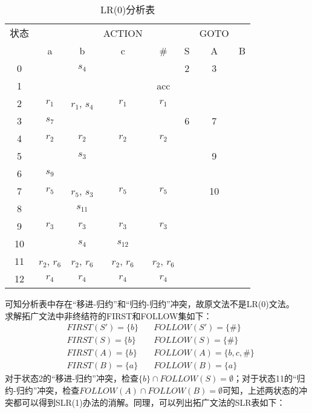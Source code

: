 \begin{table}[H]
	\caption{LR(0)分析表}
	\centering
	\begin{tabular}{|c|cccc|ccc|}
		\hline
		状态 & & & ACTION & & & GOTO & \\
		& a & b & c & \# & S & A & B \\\hline
		0 &  & $s_{4}$ &  &  & 2 & 3 & \\
		1 &  &  &  & acc &  &  & \\
		2 & $r_{1}$ & $r_{1}$, $s_{4}$ & $r_{1}$ & $r_{1}$ &  &  & \\
		3 & $s_{7}$ &  &  &  & 6 & 7 & \\
		4 & $r_{2}$ & $r_{2}$ & $r_{2}$ & $r_{2}$ &  &  & \\
		5 &  & $s_{3}$ &  &  &  & 9 & \\
		6 & $s_{9}$ &  &  &  &  &  & \\
		7 & $r_{5}$ & $r_{5}$, $s_{3}$ & $r_{5}$ & $r_{5}$ &  & 10 & \\
		8 &  & $s_{11}$ &  &  &  &  & \\
		9 & $r_{3}$ & $r_{3}$ & $r_{3}$ & $r_{3}$ &  &  & \\
		10 &  & $s_{4}$ & $s_{12}$ &  &  &  & \\
		11 & $r_{2}$, $r_{6}$ & $r_{2}$, $r_{6}$ & $r_{2}$, $r_{6}$ & $r_{2}$, $r_{6}$ &  &  & \\
		12 & $r_{4}$ & $r_{4}$ & $r_{4}$ & $r_{4}$ &  &  & \\\hline
	\end{tabular}
\end{table}
可知分析表中存在“移进-归约”和“归约-归约”冲突，故原文法不是LR(0)文法。\\
求解拓广文法中非终结符的FIRST和FOLLOW集如下：
\begin{align*}
	&FIRST(S')=\{b\} &\quad FOLLOW(S')=\{\#\} \\
	&FIRST(S)=\{b\} &\quad FOLLOW(S)=\{\#\} \\
	&FIRST(A)=\{b\} &\quad FOLLOW(A)=\{b, c, \#\} \\
	&FIRST(B)=\{a\} &\quad FOLLOW(B)=\{a\}
\end{align*}
对于状态2的“移进-归约”冲突，检查$\{b\} \cap FOLLOW(S) = \emptyset$；对于状态11的“归约-归约”冲突，检查$FOLLOW(A) \cap FOLLOW(B) = \emptyset$可知，上述两状态的冲突都可以得到SLR(1)办法的消解。同理，可以列出拓广文法的SLR表如下：
